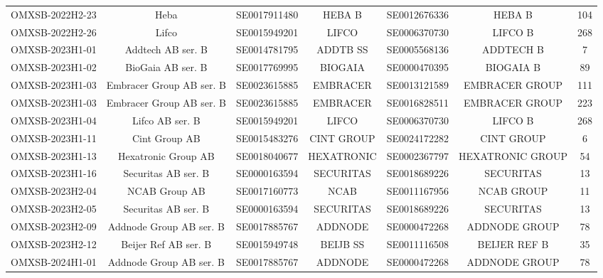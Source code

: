\begin{threeparttable}
\begin{tabular}{@{}lcccccc}
\addlinespace[0.25ex]
\addlinespace[0.25ex]
OMXSB-2022H2-23 & Heba & SE0017911480 & HEBA B & SE0012676336 & HEBA B & 104 \\
\addlinespace[0.25ex]
\addlinespace[0.25ex]
OMXSB-2022H2-26 & Lifco & SE0015949201 & LIFCO & SE0006370730 & LIFCO B & 268 \\
\addlinespace[0.25ex]
\addlinespace[0.25ex]
OMXSB-2023H1-01 & Addtech AB ser. B & SE0014781795 & ADDTB SS & SE0005568136 & ADDTECH B & 7 \\
\addlinespace[0.25ex]
\addlinespace[0.25ex]
OMXSB-2023H1-02 & BioGaia AB ser. B & SE0017769995 & BIOGAIA & SE0000470395 & BIOGAIA B & 89 \\
\addlinespace[0.25ex]
\addlinespace[0.25ex]
OMXSB-2023H1-03 & Embracer Group AB ser. B & SE0023615885 & EMBRACER & SE0013121589 & EMBRACER GROUP & 111 \\
\addlinespace[0.25ex]
\addlinespace[0.25ex]
OMXSB-2023H1-03 & Embracer Group AB ser. B & SE0023615885 & EMBRACER & SE0016828511 & EMBRACER GROUP & 223 \\
\addlinespace[0.25ex]
\addlinespace[0.25ex]
OMXSB-2023H1-04 & Lifco AB ser. B & SE0015949201 & LIFCO & SE0006370730 & LIFCO B & 268 \\
\addlinespace[0.25ex]
\addlinespace[0.25ex]
OMXSB-2023H1-11 & Cint Group AB & SE0015483276 & CINT GROUP & SE0024172282 & CINT GROUP & 6 \\
\addlinespace[0.25ex]
\addlinespace[0.25ex]
OMXSB-2023H1-13 & Hexatronic Group AB & SE0018040677 & HEXATRONIC & SE0002367797 & HEXATRONIC GROUP & 54 \\
\addlinespace[0.25ex]
\addlinespace[0.25ex]
OMXSB-2023H1-16 & Securitas AB ser. B & SE0000163594 & SECURITAS & SE0018689226 & SECURITAS & 13 \\
\addlinespace[0.25ex]
\addlinespace[0.25ex]
OMXSB-2023H2-04 & NCAB Group AB & SE0017160773 & NCAB & SE0011167956 & NCAB GROUP & 11 \\
\addlinespace[0.25ex]
\addlinespace[0.25ex]
OMXSB-2023H2-05 & Securitas AB ser. B & SE0000163594 & SECURITAS & SE0018689226 & SECURITAS & 13 \\
\addlinespace[0.25ex]
\addlinespace[0.25ex]
OMXSB-2023H2-09 & Addnode Group AB ser. B & SE0017885767 & ADDNODE & SE0000472268 & ADDNODE GROUP & 78 \\
\addlinespace[0.25ex]
\addlinespace[0.25ex]
OMXSB-2023H2-12 & Beijer Ref AB ser. B & SE0015949748 & BEIJB SS & SE0011116508 & BEIJER REF B & 35 \\
\addlinespace[0.25ex]
\addlinespace[0.25ex]
OMXSB-2024H1-01 & Addnode Group AB ser. B & SE0017885767 & ADDNODE & SE0000472268 & ADDNODE GROUP & 78 \\

\end{tabular}
\end{threeparttable}
